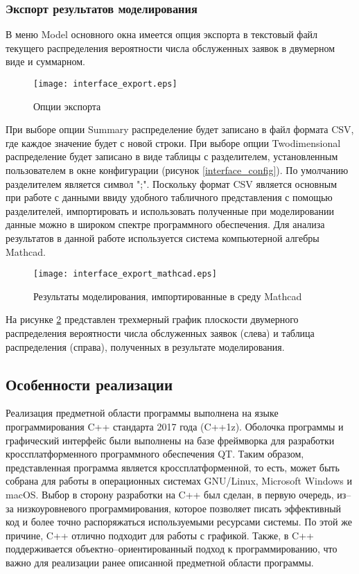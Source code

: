 \subsubsection{Экспорт результатов моделирования}
В меню Model основного окна имеется опция экспорта в текстовый файл текущего распределения вероятности числа обслуженных заявок в двумерном виде и суммарном.
\begin{figure}[H]
	\centering
	\texttt{[image: interface\_export.eps]}
	\caption{Опции экспорта}
	\label{interface_export}
\end{figure}
При выборе опции Summary распределение будет записано в файл формата CSV, где каждое значение будет с новой строки. При выборе опции Twodimensional распределение будет записано в виде таблицы с разделителем, установленным пользователем в окне конфигурации (рисунок \ref{interface_config}). По умолчанию разделителем является символ ";". Поскольку формат CSV является основным при работе с данными ввиду удобного табличного представления с помощью разделителей, импортировать и использовать полученные при моделировании данные можно в широком спектре программного обеспечения. Для анализа результатов в данной работе используется система компьютерной алгебры Mathcad.
\begin{figure}[H]
	\centering
	\texttt{[image: interface\_export\_mathcad.eps]}
	\caption{Результаты моделирования, импортированные в среду Mathcad}
	\label{interface_export_mathcad}
\end{figure}
На рисунке \ref{interface_export_mathcad} представлен трехмерный график плоскости двумерного распределения вероятности числа обслуженных заявок (слева) и таблица распределения (справа), полученных в результате моделирования.
\clearpage

\subsection{Особенности реализации}
Реализация предметной области программы выполнена на языке программирования C++ стандарта 2017 года (C++1z). Оболочка программы и графический интерфейс были выполнены на базе фреймворка для разработки кроссплатформенного программного обеспечения QT. Таким образом, представленная программа является кроссплатформенной, то есть, может быть собрана для работы в операционных системах GNU/Linux, Microsoft Windows и macOS. Выбор в сторону разработки на C++ был сделан, в первую очередь, из--за низкоуровневого программирования, которое позволяет писать эффективный код и более точно распоряжаться используемыми ресурсами системы. По этой же причине, C++ отлично подходит для работы с графикой. Также, в C++ поддерживается объектно--ориентированный подход к программированию, что важно для реализации ранее описанной предметной области программы.

